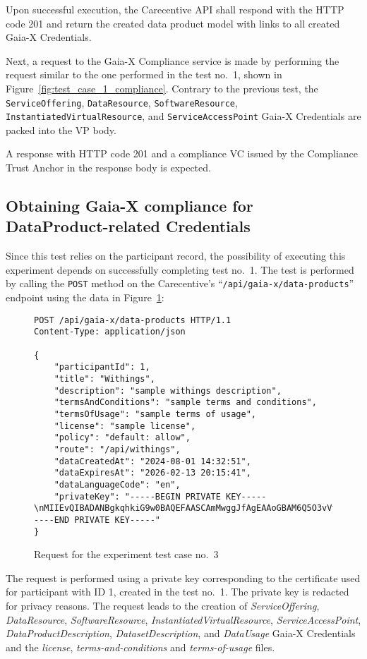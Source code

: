 Upon successful execution, the Carecentive API shall respond with the HTTP code 201 and return the created data product model with links to all created Gaia-X Credentials.

Next, a request to the Gaia-X Compliance service is made by performing the request similar to the one performed in the test no.~1, shown in Figure~\ref{fig:test_case_1_compliance}.
Contrary to the previous test, the \texttt{ServiceOffering}, \texttt{DataResource}, \texttt{SoftwareResource}, \texttt{InstantiatedVirtualResource}, and \texttt{ServiceAccessPoint} Gaia-X Credentials are packed into the VP body.

A response with HTTP code 201 and a compliance VC issued by the Compliance Trust Anchor in the response body is expected.

\subsection{Obtaining Gaia-X compliance for DataProduct-related Credentials}\label{subsec:data-product-compliance}

Since this test relies on the participant record, the possibility of executing this experiment depends on successfully completing test no.~1.
The test is performed by calling the \texttt{POST} method on the Carecentive's ``\texttt{/api/gaia-x/data-products}'' endpoint using the data in Figure~\ref{fig:test_case_3}:

\begin{figure}[h]
    \centering
    \begin{verbatim}
POST /api/gaia-x/data-products HTTP/1.1
Content-Type: application/json

{
    "participantId": 1,
	"title": "Withings",
	"description": "sample withings description",
	"termsAndConditions": "sample terms and conditions",
	"termsOfUsage": "sample terms of usage",
	"license": "sample license",
	"policy": "default: allow",
	"route": "/api/withings",
	"dataCreatedAt": "2024-08-01 14:32:51",
	"dataExpiresAt": "2026-02-13 20:15:41",
	"dataLanguageCode": "en",
	"privateKey": "-----BEGIN PRIVATE KEY-----\nMIIEvQIBADANBgkqhkiG9w0BAQEFAASCAmMwggJfAgEAAoGBAM6Q5O3vVfnxk6P7\n...\nYWw+HiFJh9XQpRUtv9PV8L8AqFFfMdsOpT6pgC+aA/WB\n-----END PRIVATE KEY-----"
}
    \end{verbatim}
    \caption{Request for the experiment test case no.~3}\label{fig:test_case_3}
\end{figure}

The request is performed using a private key corresponding to the certificate used for participant with ID 1, created in the test no.~1.
The private key is redacted for privacy reasons.
The request leads to the creation of \textit{ServiceOffering}, \textit{DataResource}, \textit{SoftwareResource}, \textit{InstantiatedVirtualResource}, \textit{ServiceAccessPoint}, \textit{DataProductDescription}, \textit{DatasetDescription}, and \textit{DataUsage} Gaia-X Credentials and the \textit{license}, \textit{terms-and-conditions} and \textit{terms-of-usage} files.

